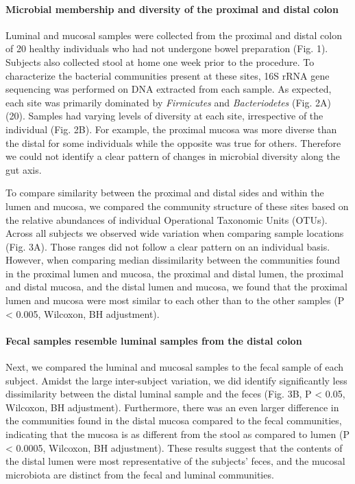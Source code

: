 \documentclass[12pt,]{article}
\let\oldparagraph\paragraph
\renewcommand{\paragraph}[1]{\oldparagraph{#1}\mbox{}}
\begin{document}
\paragraph{Microbial membership and diversity of the proximal and distal
colon}\label{microbial-membership-and-diversity-of-the-proximal-and-distal-colon}

Luminal and mucosal samples were collected from the proximal and distal
colon of 20 healthy individuals who had not undergone bowel preparation
(Fig. 1). Subjects also collected stool at home one week prior to the
procedure. To characterize the bacterial communities present at these
sites, 16S rRNA gene sequencing was performed on DNA extracted from each
sample. As expected, each site was primarily dominated by
\emph{Firmicutes} and \emph{Bacteriodetes} (Fig. 2A) (20). Samples had
varying levels of diversity at each site, irrespective of the individual
(Fig. 2B). For example, the proximal mucosa was more diverse than the
distal for some individuals while the opposite was true for others.
Therefore we could not identify a clear pattern of changes in microbial
diversity along the gut axis.

To compare similarity between the proximal and distal sides and within
the lumen and mucosa, we compared the community structure of these sites
based on the relative abundances of individual Operational Taxonomic
Units (OTUs). Across all subjects we observed wide variation when
comparing sample locations (Fig. 3A). Those ranges did not follow a
clear pattern on an individual basis. However, when comparing median
dissimilarity between the communities found in the proximal lumen and
mucosa, the proximal and distal lumen, the proximal and distal mucosa,
and the distal lumen and mucosa, we found that the proximal lumen and
mucosa were most similar to each other than to the other samples (P
\textless{} 0.005, Wilcoxon, BH adjustment).

\paragraph{Fecal samples resemble luminal samples from the distal
colon}\label{fecal-samples-resemble-luminal-samples-from-the-distal-colon}

Next, we compared the luminal and mucosal samples to the fecal sample of
each subject. Amidst the large inter-subject variation, we did identify
significantly less dissimilarity between the distal luminal sample and
the feces (Fig. 3B, P \textless{} 0.05, Wilcoxon, BH adjustment).
Furthermore, there was an even larger difference in the communities
found in the distal mucosa compared to the fecal communities, indicating
that the mucosa is as different from the stool as compared to lumen (P
\textless{} 0.0005, Wilcoxon, BH adjustment). These results suggest that
the contents of the distal lumen were most representative of the
subjects' feces, and the mucosal microbiota are distinct from the fecal
and luminal communities.
\end{document}
